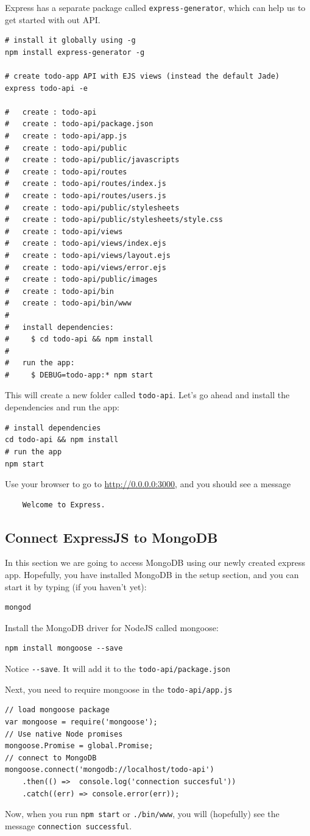 \documentclass[12pt]{article}
\begin{document}
Express has a separate package called \texttt{express-generator}, which
can help us to get started with out API.
\begin{Verbatim}
# install it globally using -g
npm install express-generator -g

# create todo-app API with EJS views (instead the default Jade)
express todo-api -e

#   create : todo-api
#   create : todo-api/package.json
#   create : todo-api/app.js
#   create : todo-api/public
#   create : todo-api/public/javascripts
#   create : todo-api/routes
#   create : todo-api/routes/index.js
#   create : todo-api/routes/users.js
#   create : todo-api/public/stylesheets
#   create : todo-api/public/stylesheets/style.css
#   create : todo-api/views
#   create : todo-api/views/index.ejs
#   create : todo-api/views/layout.ejs
#   create : todo-api/views/error.ejs
#   create : todo-api/public/images
#   create : todo-api/bin
#   create : todo-api/bin/www
#
#   install dependencies:
#     $ cd todo-api && npm install
#
#   run the app:
#     $ DEBUG=todo-app:* npm start
\end{Verbatim}
This will create a new folder called \texttt{todo-api}. Let's go ahead
and install the dependencies and run the app:
\begin{Verbatim}
# install dependencies
cd todo-api && npm install
# run the app
npm start
\end{Verbatim}
Use your browser to go to \url{http://0.0.0.0:3000}, and you should see
a message 
\begin{Verbatim}
	Welcome to Express.
\end{Verbatim}

\subsection{Connect ExpressJS to MongoDB}

In this section we are going to access MongoDB using our newly created
express app. Hopefully, you have installed MongoDB in the
setup section, and you can start it by typing (if you haven't yet):
\begin{Verbatim}
mongod
\end{Verbatim}
Install the MongoDB driver for NodeJS called mongoose:
\begin{Verbatim}
npm install mongoose --save
\end{Verbatim}
Notice \texttt{-\/-save}. It will add it to the \texttt{todo-api/package.json}

Next, you need to require mongoose in the \texttt{todo-api/app.js}
\begin{Verbatim}
// load mongoose package
var mongoose = require('mongoose');
// Use native Node promises
mongoose.Promise = global.Promise;
// connect to MongoDB
mongoose.connect('mongodb://localhost/todo-api')  
	.then(() =>  console.log('connection succesful'))  
	.catch((err) => console.error(err));
\end{Verbatim}
Now, when you run \texttt{npm\ start} or \texttt{./bin/www}, you will
(hopefully) see the message \texttt{connection\ successful}. 
\end{document}
